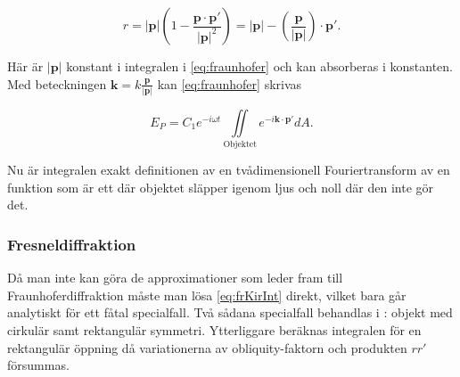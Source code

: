 \documentclass[a4paper]{article}
\begin{document}
\begin{equation}
	r = |\boldsymbol{p}|\left( 1 - \frac{\boldsymbol{p}\cdot\boldsymbol{p'}}{|\boldsymbol{p}|^2} \right) = |\boldsymbol{p}| - \left(\frac{\boldsymbol{p}}{|\boldsymbol{p}|}\right)\cdot\boldsymbol{p'}\text{.}
\end{equation}

Här är $|\boldsymbol{p}|$ konstant i integralen i \eqref{eq:fraunhofer} och kan absorberas i konstanten. Med beteckningen $\boldsymbol{k} = k \frac{\boldsymbol{p}}{|\boldsymbol{p}|}$ kan \eqref{eq:fraunhofer} skrivas

\begin{equation}
	E_P = C_1 e^{-i \omega t} \iint\limits_{\mathrm{Objektet}} {e^{-i \boldsymbol{k}\cdot\boldsymbol{p'}} dA}\text{.}
\end{equation}

Nu är integralen exakt definitionen av en tvådimensionell Fouriertransform av en funktion som är ett där objektet släpper igenom ljus och noll där den inte gör det.

\subsubsection{Fresneldiffraktion}

Då man inte kan göra de approximationer som leder fram till Fraunhoferdiffraktion måste man lösa \eqref{eq:frKirInt} direkt, vilket bara går analytiskt för ett fåtal specialfall. Två sådana specialfall behandlas i \cite{pearsonIntroOpt}: objekt med cirkulär samt rektangulär symmetri. Ytterliggare beräknas integralen för en rektangulär öppning då variationerna av obliquity-faktorn och produkten $r r'$ försummas.

\end{document}

